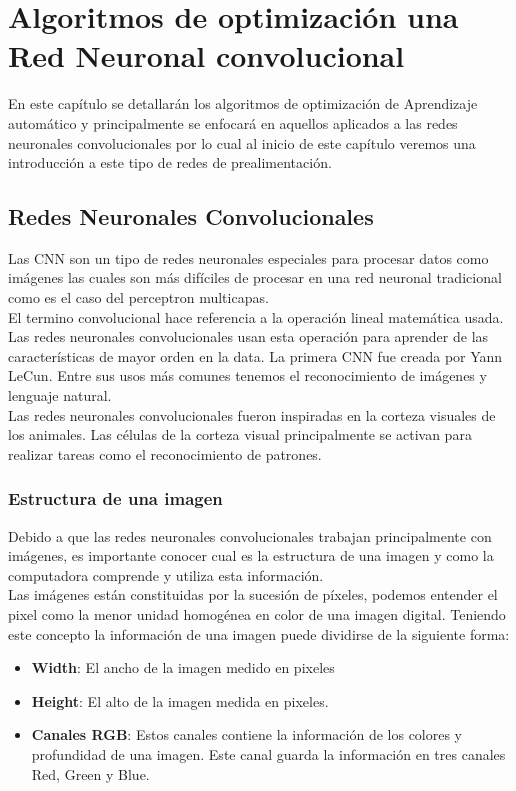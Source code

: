 \chapter{Algoritmos de optimización una Red Neuronal convolucional}
En este capítulo se detallarán los algoritmos de optimización de Aprendizaje automático y principalmente se enfocará en aquellos aplicados a las redes neuronales convolucionales por lo cual al inicio de este capítulo veremos una introducción a este tipo de redes de prealimentación.

\section{Redes Neuronales Convolucionales}
Las CNN son un tipo de redes neuronales especiales para procesar datos como imágenes las cuales son más difíciles de procesar en una red neuronal tradicional como es el caso del perceptron multicapas.\\ El termino convolucional hace referencia a la operación lineal matemática usada. Las redes neuronales convolucionales usan esta operación para aprender de las características de mayor orden en la data.
La primera CNN fue creada por Yann LeCun. Entre sus usos más comunes tenemos el reconocimiento de imágenes y lenguaje natural.\\
Las redes neuronales convolucionales fueron inspiradas en la corteza visuales de los animales. Las células de la corteza visual principalmente se activan para realizar tareas como el reconocimiento de patrones.

\subsection{Estructura de una imagen}
Debido a que las redes neuronales convolucionales trabajan principalmente con imágenes, es importante conocer cual es la estructura de una imagen y como la computadora comprende y utiliza esta información.\\
Las imágenes están constituidas por la sucesión de píxeles, podemos entender el pixel como la menor unidad homogénea en color de una imagen digital. Teniendo este concepto la información de una imagen puede dividirse de la siguiente forma:
\begin{itemize}
	\item \textbf{Width}: El ancho de la imagen medido en pixeles
	\item \textbf{Height}: El alto de la imagen medida en pixeles.
	\item \textbf{Canales RGB}: Estos canales contiene la información de los colores y profundidad de una imagen. Este canal guarda la información en tres canales Red, Green y Blue.
\end{itemize}

